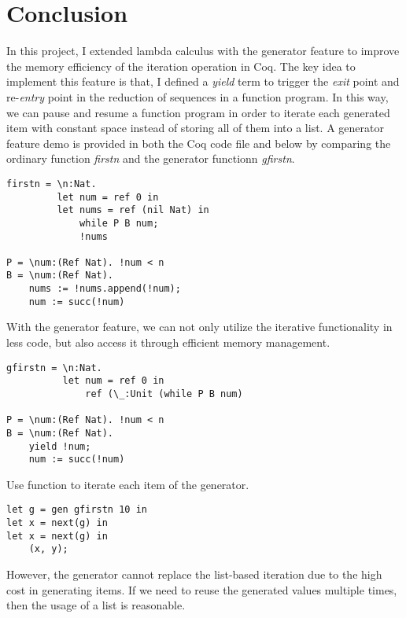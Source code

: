 \section{Conclusion}
\label{sec:conclusion}
In this project, I extended lambda calculus with the generator feature to improve the memory efficiency of the iteration operation in Coq. The key idea to implement this feature is that, I defined a \textit{yield} term to trigger the \textit{exit} point and re-\textit{entry} point in the reduction of sequences in a function program. In this way, we can pause and resume a function program in order to iterate each generated item with constant space instead of storing all of them into a list. A generator feature demo is provided in both the Coq code file and below by comparing the ordinary function \textit{firstn} and the generator functionn \textit{gfirstn}. 
\begin{lstlisting}
firstn = \n:Nat.
         let num = ref 0 in 
         let nums = ref (nil Nat) in 
             while P B num;
             !nums

P = \num:(Ref Nat). !num < n
B = \num:(Ref Nat). 
    nums := !nums.append(!num); 
    num := succ(!num)
\end{lstlisting}
With the generator feature, we can not only utilize the iterative functionality in less code, but also access it through efficient memory management.
\begin{lstlisting}
gfirstn = \n:Nat.
          let num = ref 0 in 
              ref (\_:Unit (while P B num)

P = \num:(Ref Nat). !num < n
B = \num:(Ref Nat). 
    yield !num; 
    num := succ(!num)
\end{lstlisting}
Use \nt function to iterate each item of the generator.
\begin{lstlisting}
let g = gen gfirstn 10 in
let x = next(g) in
let x = next(g) in
    (x, y);
\end{lstlisting}
However, the generator cannot replace the list-based iteration due to the high cost in generating items. If we need to reuse the generated values multiple times, then the usage of a list is reasonable.

